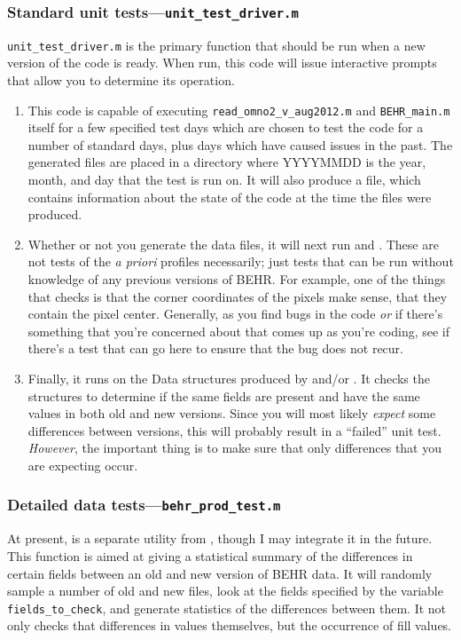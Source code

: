 \documentclass[12pt]{article}
\begin{document}
	\subsubsection{Standard unit tests---\lstinline$unit_test_driver.m$}
	\lstinline$unit_test_driver.m$ is the primary function that should be run when a new version of the code is ready.  When run, this code will issue interactive prompts that allow you to determine its operation.
	\begin{enumerate}
	\item This code is capable of executing \lstinline$read_omno2_v_aug2012.m$ and \lstinline$BEHR_main.m$ itself for a few specified test days which are chosen to test the code for a number of standard days, plus days which have caused issues in the past.  The generated files are placed in a directory  where YYYYMMDD is the year, month, and day that the test is run on. It will also produce a file,  which contains information about the state of the code at the time the files were produced.
	
	\item Whether or not you generate the data files, it will next run  and . These are not tests of the \emph{a priori} profiles necessarily; just tests that can be run without knowledge of any previous versions of BEHR. For example, one of the things that  checks is that the corner coordinates of the pixels make sense, that they contain the pixel center. Generally, as you find bugs in the code \emph{or} if there's something that you're concerned about that comes up as you're coding, see if there's a test that can go here to ensure that the bug does not recur.
	
	\item Finally, it runs  on the Data structures produced by  and/or . It checks the structures to determine if the same fields are present and have the same values in both old and new versions. Since you will most likely \emph{expect} some differences between versions, this will probably result in a ``failed'' unit test. \emph{However}, the important thing is to make sure that only differences that you are expecting occur.
	\end{enumerate}
	
	\subsubsection{Detailed data tests---\lstinline$behr_prod_test.m$}
	At present,  is a separate utility from , though I may integrate it in the future.  This function is aimed at giving a statistical summary of the differences in certain fields between an old and new version of BEHR data. It will randomly sample a number of old and new files, look at the fields specified by the variable \lstinline$fields_to_check$, and generate statistics of the differences between them. It not only checks that differences in values themselves, but the occurrence of fill values.
	
\end{document}
